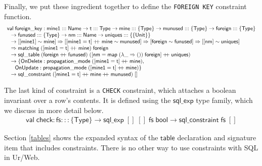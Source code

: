 \documentclass{article}
\newcommand{\mt}[1]{\mathsf{#1}}
\newcommand{\rc}{+ \hspace{-.075in} + \;}
\begin{document}
Finally, we put these ingredient together to define the \texttt{FOREIGN KEY} constraint function.
$$\begin{array}{l}
  \mt{val} \; \mt{foreign\_key} : \mt{mine1} ::: \mt{Name} \to \mt{t} ::: \mt{Type} \to \mt{mine} ::: \{\mt{Type}\} \to \mt{munused} ::: \{\mt{Type}\} \to \mt{foreign} ::: \{\mt{Type}\} \\
  \hspace{.1in} \to \mt{funused} ::: \{\mt{Type}\} \to \mt{nm} ::: \mt{Name} \to \mt{uniques} ::: \{\{\mt{Unit}\}\} \\
  \hspace{.1in} \to [[\mt{mine1}] \sim \mt{mine}] \Rightarrow [[\mt{mine1} = \mt{t}] \rc \mt{mine} \sim \mt{munused}] \Rightarrow [\mt{foreign} \sim \mt{funused}] \Rightarrow [[\mt{nm}] \sim \mt{uniques}] \\
  \hspace{.1in} \Rightarrow \mt{matching} \; ([\mt{mine1} = \mt{t}] \rc \mt{mine}) \; \mt{foreign} \\
  \hspace{.1in} \to \mt{sql\_table} \; (\mt{foreign} \rc \mt{funused}) \; ([\mt{nm} = \mt{map} \; (\lambda \_ \Rightarrow ()) \; \mt{foreign}] \rc \mt{uniques}) \\
  \hspace{.1in} \to \{\mt{OnDelete} : \mt{propagation\_mode} \; ([\mt{mine1} = \mt{t}] \rc \mt{mine}), \\
  \hspace{.2in} \mt{OnUpdate} : \mt{propagation\_mode} \; ([\mt{mine1} = \mt{t}] \rc \mt{mine})\} \\
  \hspace{.1in} \to \mt{sql\_constraint} \; ([\mt{mine1} = \mt{t}] \rc \mt{mine} \rc \mt{munused}) \; []
\end{array}$$

The last kind of constraint is a \texttt{CHECK} constraint, which attaches a boolean invariant over a row's contents.  It is defined using the $\mt{sql\_exp}$ type family, which we discuss in more detail below.
$$\begin{array}{l}
  \mt{val} \; \mt{check} : \mt{fs} ::: \{\mt{Type}\} \to \mt{sql\_exp} \; [] \; [] \; \mt{fs} \; \mt{bool} \to \mt{sql\_constraint} \; \mt{fs} \; []
\end{array}$$

Section \ref{tables} shows the expanded syntax of the $\mt{table}$ declaration and signature item that includes constraints.  There is no other way to use constraints with SQL in Ur/Web.
\end{document}
